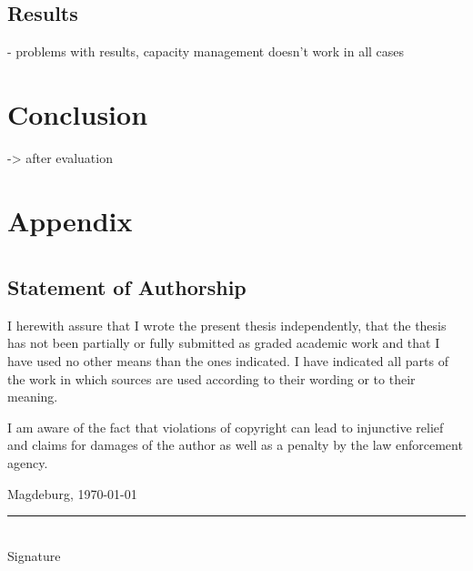 \documentclass[
	12pt,
	a4paper,
	abstract,
	bibliography=totoc,
	chapterprefix,
	headings=openright,
	numbers=endperiod,
	parskip=half,
	twoside,
]{scrreprt}
\begin{document}
\section{Results}

- problems with results, capacity management doesn't work in all cases

\chapter{Conclusion}
\label{cha:conclusion}

-> after evaluation








\appendix

\chapter{Appendix}
\label{cha:appendix}


\setcounter{tocdepth}{1}
\listoffigures

\setcounter{tocdepth}{1}
\listoftables

\lstlistoflistings

\chapter*{}

\section*{Statement of Authorship}

I herewith assure that I wrote the present thesis independently, that the thesis has not been partially or fully submitted as graded academic work and that I have used no other means than the ones indicated.
I have indicated all parts of the work in which sources are used according to their wording or to their meaning.

I am aware of the fact that violations of copyright can lead to injunctive relief and claims for damages of the author as well as a penalty by the law enforcement agency.

\bigskip

Magdeburg, \today

\bigskip
\bigskip

\rule{0.5\textwidth}{0.5pt}\\
\hspace*{0.25em}Signature
\end{document}
